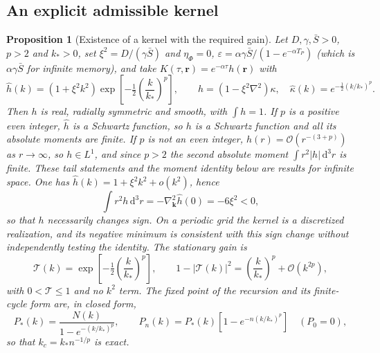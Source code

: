 \documentclass[11pt]{article}
\newtheorem{proposition}{Proposition}[section]
\theoremstyle{definition}
\theoremstyle{remark}
\newcommand{\dd}{\mathrm{d}}
\newcommand{\TT}{\mathcal{T}}
\newcommand{\Sb}{\bar{S}}
\begin{document}
\subsection{An explicit admissible kernel}

\begin{proposition}[Existence of a kernel with the required gain]\label{prop:kernel}
Let $D,\gamma,\Sb>0$, $p>2$ and $k_*>0$, set $\xi^2=D/(\gamma\Sb)$ and $\eta_\Phi=0$, $\varepsilon=\alpha\gamma\Sb/(1-e^{-\alpha T_P})$ (which is $\alpha\gamma\Sb$ for infinite memory), and take $K(\tau,\mathbf r)=e^{-\alpha\tau}h(\mathbf r)$ with
\begin{equation}
\hat h(k)=\left(1+\xi^2k^2\right)\exp\!\left[-\tfrac12\left(\frac k{k_*}\right)^p\right],\qquad h=(1-\xi^2\nabla^2)\kappa,\quad\hat\kappa(k)=e^{-\frac12(k/k_*)^p}.
\end{equation}
Then $h$ is real, radially symmetric and smooth, with $\int h=1$. If $p$ is a positive even integer, $\hat h$ is a Schwartz function, so $h$ is a Schwartz function and all its absolute moments are finite. If $p$ is not an even integer, $h(r)=\mathcal O(r^{-(3+p)})$ as $r\to\infty$, so $h\in L^1$, and since $p>2$ the second absolute moment $\int r^2|h|\,\dd^3r$ is finite. These tail statements and the moment identity below are results for infinite space. One has $\hat h(k)=1+\xi^2k^2+o(k^2)$, hence
\begin{equation}
\int r^2h\,\dd^3r=-\nabla_{\mathbf k}^2\hat h(0)=-6\xi^2<0,
\end{equation}
so that $h$ necessarily changes sign. On a periodic grid the kernel is a discretized realization, and its negative minimum is consistent with this sign change without independently testing the identity. The stationary gain is
\begin{equation}
\TT(k)=\exp\!\left[-\tfrac12\left(\frac k{k_*}\right)^p\right],\qquad1-|\TT(k)|^2=\left(\frac k{k_*}\right)^p+\mathcal O\!\left(k^{2p}\right),
\end{equation}
with $0<\TT\le1$ and no $k^2$ term. The fixed point of the recursion and its finite-cycle form are, in closed form,
\begin{equation}
P_*(k)=\frac{N(k)}{1-e^{-(k/k_*)^p}},\qquad P_n(k)=P_*(k)\left[1-e^{-n(k/k_*)^p}\right]\quad(P_0=0),
\label{eq:exactPn}
\end{equation}
so that $k_c=k_*n^{-1/p}$ is exact.
\end{proposition}
\end{document}
